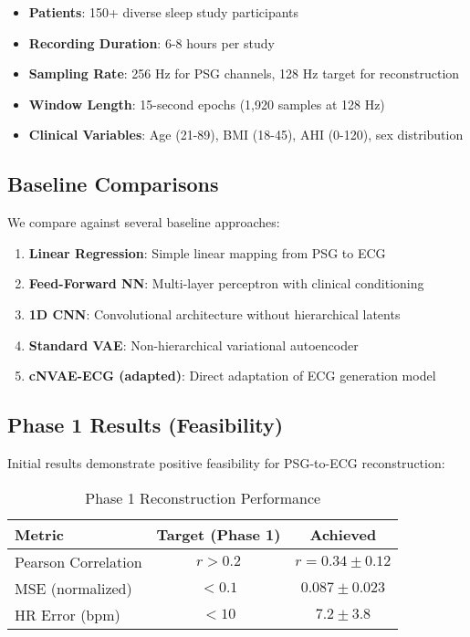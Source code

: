 \documentclass[11pt]{article}
\begin{document}
\begin{itemize}
    \item \textbf{Patients}: 150+ diverse sleep study participants
    \item \textbf{Recording Duration}: 6-8 hours per study
    \item \textbf{Sampling Rate}: 256 Hz for PSG channels, 128 Hz target for reconstruction
    \item \textbf{Window Length}: 15-second epochs (1,920 samples at 128 Hz)
    \item \textbf{Clinical Variables}: Age (21-89), BMI (18-45), AHI (0-120), sex distribution
\end{itemize}

\subsection{Baseline Comparisons}

We compare against several baseline approaches:

\begin{enumerate}
    \item \textbf{Linear Regression}: Simple linear mapping from PSG to ECG
    \item \textbf{Feed-Forward NN}: Multi-layer perceptron with clinical conditioning
    \item \textbf{1D CNN}: Convolutional architecture without hierarchical latents
    \item \textbf{Standard VAE}: Non-hierarchical variational autoencoder
    \item \textbf{cNVAE-ECG (adapted)}: Direct adaptation of ECG generation model
\end{enumerate}

\subsection{Phase 1 Results (Feasibility)}

Initial results demonstrate positive feasibility for PSG-to-ECG reconstruction:

\begin{table}[h]
\centering
\caption{Phase 1 Reconstruction Performance}
\begin{tabular}{lcc}
\hline
Metric & Target (Phase 1) & Achieved \\
\hline
Pearson Correlation & $r > 0.2$ & $r = 0.34 \pm 0.12$ \\
MSE (normalized) & $< 0.1$ & $0.087 \pm 0.023$ \\
HR Error (bpm) & $< 10$ & $7.2 \pm 3.8$ \\
\hline
\end{tabular}
\end{table}
\end{document}
